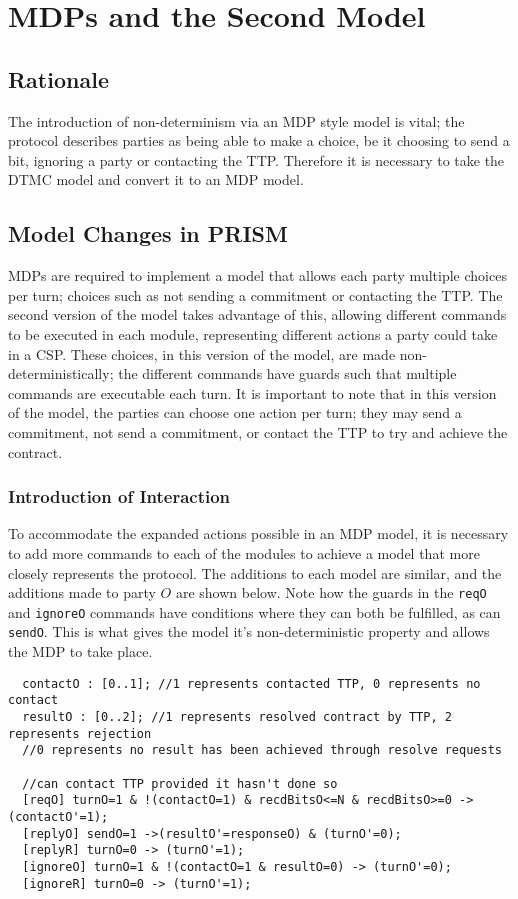 \documentclass{l4proj}
\begin{document}
\chapter{MDPs and the Second Model}

\section{Rationale}
The introduction of non-determinism via an MDP style model is vital; the protocol describes parties as being able to make a choice, be it choosing to send a bit, ignoring a party or contacting the TTP. Therefore it is necessary to take the DTMC model and convert it to an MDP model. 


\section{Model Changes in PRISM}

MDPs are required to implement a model that allows each party multiple choices per turn; choices such as not sending a commitment or contacting the TTP. The second version of the model takes advantage of this, allowing different commands to be executed in each module, representing different actions a party could take in a CSP. These choices, in this version of the model, are made non-deterministically; the different commands have guards such that multiple commands are executable each turn. It is important to note that in this version of the model, the parties can choose one action per turn; they may send a commitment, not send a commitment, or contact the TTP to try and achieve the contract.

\subsection{Introduction of Interaction}

To accommodate the expanded actions possible in an MDP model, it is necessary to add more commands to each of the modules to achieve a model that more closely represents the protocol. The additions to each model are similar, and the additions made to party $O$ are shown below. Note how the guards in the {\tt reqO} and {\tt ignoreO} commands have conditions where they can both be fulfilled, as can {\tt sendO}. This is what gives the model it's non-deterministic property and allows the MDP to take place.
\begin{lstlisting}
  contactO : [0..1]; //1 represents contacted TTP, 0 represents no contact
  resultO : [0..2]; //1 represents resolved contract by TTP, 2 represents rejection
  //0 represents no result has been achieved through resolve requests
	
  //can contact TTP provided it hasn't done so
  [reqO] turnO=1 & !(contactO=1) & recdBitsO<=N & recdBitsO>=0 -> (contactO'=1);
  [replyO] sendO=1 ->(resultO'=responseO) & (turnO'=0);
  [replyR] turnO=0 -> (turnO'=1);
  [ignoreO] turnO=1 & !(contactO=1 & resultO=0) -> (turnO'=0);
  [ignoreR] turnO=0 -> (turnO'=1);
\end{lstlisting}
\end{document}
